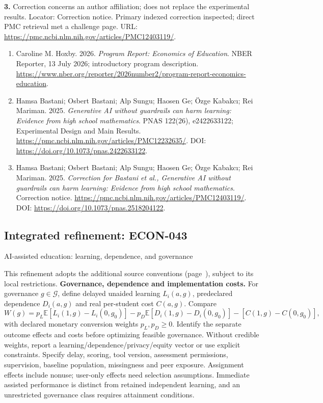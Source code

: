 \documentclass[11pt,a4paper]{article}
\begin{document}
\textbf{3.} Correction concerns an author affiliation; does not replace the experimental results. Locator: Correction notice. Primary indexed correction inspected; direct PMC retrieval met a challenge page. URL: \url{https://pmc.ncbi.nlm.nih.gov/articles/PMC12403119/}.
\begin{enumerate}\raggedright
\item\hypertarget{definitions:source:30007735:1}{} Caroline M. Hoxby. 2026. \emph{Program Report: Economics of Education}. NBER Reporter, 13 July 2026; introductory program description.
\url{https://www.nber.org/reporter/2026number2/program-report-economics-education}.
\item\hypertarget{definitions:source:30007735:2}{} Hamsa Bastani; Osbert Bastani; Alp Sungu; Haosen Ge; \"{O}zge Kabakc\i{}; Rei Mariman. 2025. \emph{Generative AI without guardrails can harm learning: Evidence from high school mathematics}. PNAS 122(26), e2422633122; Experimental Design and Main Results.
\url{https://pmc.ncbi.nlm.nih.gov/articles/PMC12232635/}.
DOI: \url{https://doi.org/10.1073/pnas.2422633122}.
\item\hypertarget{definitions:source:30007735:3}{} Hamsa Bastani; Osbert Bastani; Alp Sungu; Haosen Ge; \"{O}zge Kabakc\i{}; Rei Mariman. 2025. \emph{Correction for Bastani et al., Generative AI without guardrails can harm learning: Evidence from high school mathematics}. Correction notice.
\url{https://pmc.ncbi.nlm.nih.gov/articles/PMC12403119/}.
DOI: \url{https://doi.org/10.1073/pnas.2518204122}.
\end{enumerate}

\subsection*{Integrated refinement: ECON-043}
{\sffamily\small\color{muted}AI-assisted education: learning, dependence, and governance\par}
This refinement adopts the additional source conventions
(page~\pageref{audited:conventions}), subject to its local restrictions.
\textbf{Governance, dependence and implementation costs.}
For governance $g\in\mathcal G$, define delayed unaided learning $L_i(a,g)$,
predeclared dependence $D_i(a,g)$ and real per-student cost $C(a,g)$. Compare
\[
W(g)=p_L\mathbb E[L_i(1,g)-L_i(0,g_0)]
     -p_D\mathbb E[D_i(1,g)-D_i(0,g_0)]
     -[C(1,g)-C(0,g_0)],
\]
with declared monetary conversion weights $p_L,p_D\geq0$. Identify the separate
outcome effects and costs before optimizing feasible governance. Without
credible weights, report a learning/dependence/privacy/equity vector or use
explicit constraints. Specify delay, scoring, tool version, assessment
permissions, supervision, baseline population, missingness and peer exposure.
Assignment effects include nonuse; user-only effects need selection assumptions.
Immediate assisted performance is distinct from retained independent learning,
and an unrestricted governance class requires attainment conditions.
\end{document}
